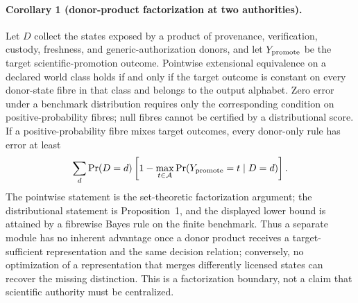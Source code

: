 \paragraph{Corollary 1 (donor-product factorization at two authorities).}
Let $D$ collect the states exposed by a product of provenance, verification,
custody, freshness, and generic-authorization donors, and let $Y_{\rm promote}$
be the target scientific-promotion outcome. Pointwise extensional equivalence
on a declared world class holds if and only if the target outcome is constant
on every donor-state fibre in that class and belongs to the output alphabet.
Zero error under a benchmark distribution requires only the corresponding
condition on positive-probability fibres; null fibres cannot be certified by a
distributional score. If a positive-probability fibre mixes target outcomes,
every donor-only rule has error at least
\begin{equation}
  \sum_d \Pr(D=d)
  \left[1-\max_{t\in\mathcal{A}}
  \Pr(Y_{\rm promote}=t\mid D=d)\right].
  \label{eq:mixed-fibre-bound}
\end{equation}
The pointwise statement is the set-theoretic factorization argument; the
distributional statement is Proposition~1, and the displayed lower bound is
attained by a fibrewise Bayes rule on the finite benchmark. Thus a separate module has no inherent advantage once a donor product receives
a target-sufficient representation and the same decision relation; conversely,
no optimization of a representation that merges differently licensed states
can recover the missing distinction.  This is a factorization boundary, not a
claim that scientific authority must be centralized.


